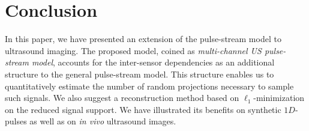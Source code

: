 \documentclass[journal]{IEEEtran}
\theoremstyle{definition}
\begin{document}
\section{Conclusion}
\label{sec_concl}
In this paper, we have presented an extension of the pulse-stream model to ultrasound imaging. The proposed model, coined as \textit{multi-channel US pulse-stream model}, accounts for the inter-sensor dependencies as an additional structure to the general pulse-stream model. This structure enables us to quantitatively estimate the number of random projections necessary to sample such signals. We also suggest a reconstruction method based on $\ell_1$-minimization on the reduced signal support. We have illustrated its benefits on synthetic $1D$-pulses as well as on \textit{in vivo} ultrasound images.






%


\ifCLASSOPTIONcaptionsoff
  \newpage
\fi



\end{document}
